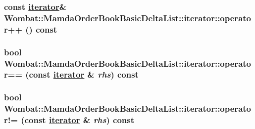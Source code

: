 \hypertarget{classWombat_1_1MamdaOrderBookBasicDeltaList_1_1iterator_38eda689f28fc11edf74914cd5f3d8fb}{
\subsubsection[operator++]{\setlength{\rightskip}{0pt plus 5cm}const \hyperlink{classWombat_1_1MamdaOrderBookBasicDeltaList_1_1iterator}{iterator}\& Wombat::Mamda\-Order\-Book\-Basic\-Delta\-List::iterator::operator++ () const}}
\label{classWombat_1_1MamdaOrderBookBasicDeltaList_1_1iterator_38eda689f28fc11edf74914cd5f3d8fb}


\hypertarget{classWombat_1_1MamdaOrderBookBasicDeltaList_1_1iterator_a676b915cb2c61128a0ef3f12deb72f9}{
\subsubsection[operator==]{\setlength{\rightskip}{0pt plus 5cm}bool Wombat::Mamda\-Order\-Book\-Basic\-Delta\-List::iterator::operator== (const \hyperlink{classWombat_1_1MamdaOrderBookBasicDeltaList_1_1iterator}{iterator} \& {\em rhs}) const}}
\label{classWombat_1_1MamdaOrderBookBasicDeltaList_1_1iterator_a676b915cb2c61128a0ef3f12deb72f9}


\hypertarget{classWombat_1_1MamdaOrderBookBasicDeltaList_1_1iterator_80c1e77e88b58eb571d26da4a5077043}{
\subsubsection[operator"!=]{\setlength{\rightskip}{0pt plus 5cm}bool Wombat::Mamda\-Order\-Book\-Basic\-Delta\-List::iterator::operator!= (const \hyperlink{classWombat_1_1MamdaOrderBookBasicDeltaList_1_1iterator}{iterator} \& {\em rhs}) const}}
\label{classWombat_1_1MamdaOrderBookBasicDeltaList_1_1iterator_80c1e77e88b58eb571d26da4a5077043}


